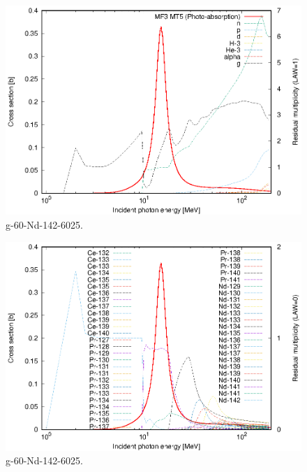 \begin{figure}
 \includegraphics[width=\linewidth]{eps/g_60-Nd-142_6025.eps}
  \caption{g-60-Nd-142-6025.}
\end{figure}
\begin{figure}
 \includegraphics[width=\linewidth]{eps-law0/g_60-Nd-142_6025.eps}
 \caption{g-60-Nd-142-6025.}
\end{figure}
\newpage \clearpage

